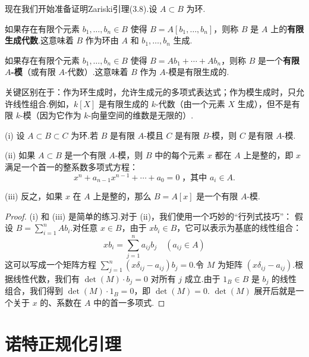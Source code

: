 现在我们开始准备证明Zariski引理(3.8).设 \(A \subset  B\) 为环.
\begin{definition}
如果存在有限个元素 \({b}_{1},\ldots ,{b}_{n} \in B\) 使得 \(B = A\left\lbrack  {{b}_{1},\ldots ,{b}_{n}}\right\rbrack\)，则称 \(B\) 是 \(A\) 上的\textbf{有限生成代数}.这意味着 \(B\) 作为环由 \(A\) 和 \({b}_{1},\ldots ,{b}_{n}\) 生成.

如果存在有限个元素 \({b}_{1},\ldots ,{b}_{n} \in B\) 使得 \(B = A{b}_{1} + \cdots  + A{b}_{n}\)，则称 \(B\) 是一个\textbf{有限 \(A\)-模}（或有限 \(A\)-代数）.这意味着 \(B\) 作为 \(A\)-模是有限生成的.
\end{definition}
关键区别在于：作为环生成时，允许生成元的多项式表达式；作为模生成时，只允许线性组合.例如，\(k\left\lbrack  X\right\rbrack\) 是有限生成的 \(k\)-代数（由一个元素 \(X\) 生成），但不是有限 \(k\)-模（因为它作为 \(k\)-向量空间的维数是无限的）.

\begin{proposition}
(i) 设 \(A \subset  B \subset  C\) 为环.若 \(B\) 是有限 \(A\)-模且 \(C\) 是有限 \(B\)-模，则 \(C\) 是有限 \(A\)-模.

(ii) 如果 \(A \subset  B\) 是一个有限 \(A\)-模，则 \(B\) 中的每个元素 \(x\) 都在 \(A\) 上是整的，即 \(x\) 满足一个首一的整系数多项式方程：
\[
{x}^{n} + {a}_{n - 1}{x}^{n - 1} + \cdots  + {a}_{0} = 0\;\text{，其中 }{a}_{i} \in  A.
\]

(iii) 反之，如果 \(x\) 在 \(A\) 上是整的，那么 \(B = A\left\lbrack  x\right\rbrack\) 是一个有限 \(A\)-模.
\end{proposition}

\begin{proof}
(i) 和 (iii) 是简单的练习.对于 (ii)，我们使用一个巧妙的“行列式技巧”：
假设 \(B = \sum_{i=1}^n A{b}_{i}\).对任意 \(x \in B\)，由于 \(x{b}_{i} \in  B\)，它可以表示为基底的线性组合：
\[
x{b}_{i} = \sum_{j=1}^n {a}_{ij}{b}_{j} \quad (a_{ij} \in A)
\]
这可以写成一个矩阵方程 \(\sum_{j=1}^n \left( {x{\delta }_{ij} - {a}_{ij}}\right) {b}_{j} = 0\).令 \(M\) 为矩阵 \((x{\delta }_{ij} - {a}_{ij})\).根据线性代数，我们有 \(\det(M) \cdot b_j = 0\) 对所有 \(j\) 成立.由于 \(1_B \in B\) 是 \(b_j\) 的线性组合，我们得到 \(\det(M) \cdot 1_B = 0\)，即 \(\det(M)=0\).
\(\det(M)\) 展开后就是一个关于 \(x\) 的、系数在 \(A\) 中的首一多项式.
\end{proof}

\section{诺特正规化引理}

